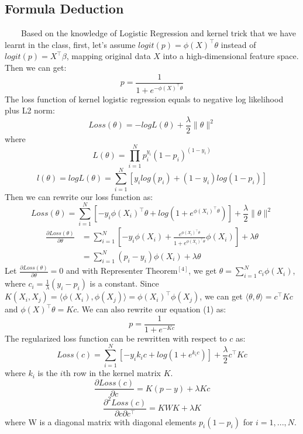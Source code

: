 \documentclass[11pt, oneside]{article}   	%
\begin{document}
\subsection{Formula Deduction}
~~~~Based on the knowledge of Logistic Regression and kernel trick that we have learnt in the class, first, let's assume $logit(p)=\phi(X)^{\top}\theta$ instead of $logit(p)=X^{\top}\beta$, mapping original data $X$ into a high-dimensional feature space. Then we can get: \begin{equation}\label{p} p=\frac{1}{1+e^{-\phi(X)^{\top}\theta}}\end{equation} The loss function of kernel logistic regression equals to negative log likelihood plus L2 norm:
\begin{equation}\label{loss} Loss(\theta)=-logL(\theta)+\frac{\lambda}{2}\|\theta\|^2\end{equation} where \begin{equation}
\label{L}
L(\theta)=\prod_{i=1}^{N}p_i^{y_i}(1-p_i)^{(1-y_i)}
\end{equation}
\begin{equation}
\label{l}
l(\theta)=logL(\theta)=\sum_{i=1}^{N}[y_ilog(p_i)+(1-y_i)log(1-p_i)]
\end{equation}
Then we can rewrite our loss function as:
\begin{equation}
Loss(\theta)=\sum_{i=1}^{N}[-y_i\phi(X_i)^{\top}\theta+log(1+e^{\phi(X_i)^{\top}\theta})]+\frac{\lambda}{2}\|\theta\|^2
\end{equation}
\begin{equation}
\label{eql}
\begin{split}
\frac{\partial{Loss(\theta)}}{\partial{\theta}} & =\sum_{i=1}^{N}[-y_i\phi(X_i)+\frac{e^{\phi(X_i)^{\top}\theta}}{1+e^{\phi(X_i)^{\top}\theta}}\phi(X_i)]+\lambda\theta \\
& = \sum_{i=1}^{N}(p_i-y_i)\phi(X_i)+\lambda\theta
\end{split}
\end{equation}
Let $\frac{\partial{Loss(\theta)}}{\partial{\theta}} = 0$ and with Representer Theorem$^{[4]}$, we get $\theta=\sum_{i=1}^{N}c_i\phi(X_i)$, where $c_i=\frac{1}{\lambda}(y_i-p_i)$ is a constant. Since $K(X_i, X_j)=\langle\phi(X_i), \phi(X_j)\rangle=\phi(X_i)^{\top}\phi(X_j)$, we can get $\langle\theta,\theta\rangle=c^{\top}Kc$ and $\phi(X)^{\top}\theta=Kc$. We can also rewrite our equation (1) as:
\begin{equation}
p=\frac{1}{1+e^{-Kc}}
\end{equation}
The regularized loss function can be rewritten with respect to $c$ as:
\begin{equation}
Loss(c)=\sum_{i=1}^{N}[-y_ik_ic+log(1+e^{k_ic})]+\frac{\lambda}{2}c^{\top}Kc
\end{equation}
where $k_i$ is the $i$th row in the kernel matrix $K$.
\begin{equation}
\frac{\partial{Loss(c)}}{\partial{c}}=K(p-y)+\lambda Kc
\end{equation}
\begin{equation}
\frac{\partial^2{Loss(c)}}{\partial{c}\partial{c^{\top}}}=KWK+\lambda K
\end{equation}
where W is a diagonal matrix with diagonal elements $p_i(1-p_i)$ for $i = 1,..., N.$
\end{document}
